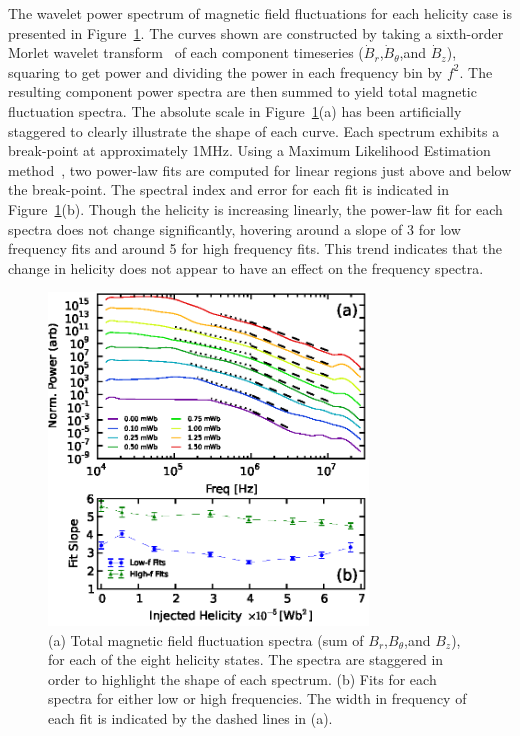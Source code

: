 \documentclass[aps,prl,amsmath,amssymb,reprint,superscriptaddress]{revtex4-1} %
\begin{document}
The wavelet power spectrum of magnetic field fluctuations for each helicity case is presented in Figure~\ref{fig:Btot_spectra}. The curves shown are constructed by taking a sixth-order Morlet wavelet transform~\cite{torrence98} of each component timeseries ($\dot{B}_r$,$\dot{B}_{\theta}$,and $\dot{B}_{z}$), squaring to get power and dividing the power in each frequency bin by $f^{2}$. The resulting component power spectra are then summed to yield total magnetic fluctuation spectra. The absolute scale in Figure~\ref{fig:Btot_spectra}(a) has been artificially staggered to clearly illustrate the shape of each curve. Each spectrum exhibits a break-point at approximately 1MHz. Using a Maximum Likelihood Estimation method~\cite{clauset09}, two power-law fits are computed for linear regions just above and below the break-point. The spectral index and error for each fit is indicated in Figure~\ref{fig:Btot_spectra}(b). Though the helicity is increasing linearly, the power-law fit for each spectra does not change significantly, hovering around a slope of 3 for low frequency fits and around 5 for high frequency fits. This trend indicates that the change in helicity does not appear to have an effect on the frequency spectra.

\begin{figure}[!htbp]
\centerline{
\includegraphics[width=8.5cm]{figure2.eps}}
\caption{\label{fig:Btot_spectra} (a) Total magnetic field fluctuation spectra (sum of $B_r$,$B_{\theta}$,and $B_{z}$), for each of the eight helicity states. The spectra are staggered in order to highlight the shape of each spectrum. (b) Fits for each spectra for either low or high frequencies. The width in frequency of each fit is indicated by the dashed lines in (a).}
\end{figure}
\end{document}
